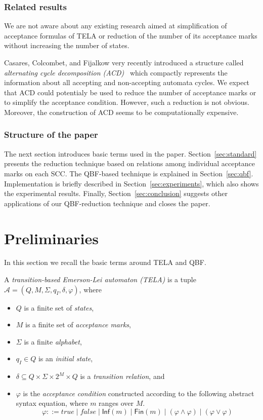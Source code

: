 \documentclass[runningheads]{llncs}
\def\Inf{\ensuremath{\mathsf{Inf}}}
\def\Fin{\ensuremath{\mathsf{Fin}}}
\def\false{\mathit{false}}
\def\true{\mathit{true}}
\newcommand{\mA}{\mathcal{A}}
\begin{document}
\subsubsection{Related results}
We are not aware about any existing research aimed at simplification
of acceptance formulas of TELA or reduction of the number of its
acceptance marks without increasing the number of states.

Casares, Colcombet, and Fijalkow very recently introduced a structure
called \emph{alternating cycle decomposition
  (ACD)}~\cite{casares.21.icalp} which compactly represents the
information about all accepting and non-accepting automata cycles.  We
expect that ACD could potentialy be used to reduce the number of
acceptance marks or to simplify the acceptance condition. However,
such a reduction is not obvious. Moreover, the construction of ACD
seems to be computationally expensive.

\subsubsection{Structure of the paper} The next section introduces
basic terms used in the paper. Section~\ref{sec:standard} presents the
reduction technique based on relations among individual acceptance
marks on each SCC. The QBF-based technique is explained in
Section~\ref{sec:qbf}. Implementation is briefly described in
Section~\ref{sec:experiments}, which also shows the experimental
results. Finally, Section~\ref{sec:conclusion} suggests other
applications of our QBF-reduction technique and closes the paper.


\section{Preliminaries}\label{sec:prelim}

In this section we recall the basic terms around TELA and QBF.

\begin{definition}[TELA]
  A \emph{transition-based Emerson-Lei automaton (TELA)} is a tuple
  $\mA =(Q,M,\Sigma,q_I,\delta,\varphi)$, where
  \begin{itemize}
  \item $Q$ is a finite set of \emph{states},
  \item $M$ is a finite set of \emph{acceptance marks},
  \item $\Sigma$ is a finite \emph{alphabet},
  \item $q_I\in Q$ is an \emph{initial state},
  \item $\delta \subseteq Q \times \Sigma \times 2^{M} \times Q$ is a
    \emph{transition relation}, and
  \item $\varphi$ is the \emph{acceptance condition} constructed
    according to the following abstract syntax equation, where $m$
    ranges over $M$.
    $$\varphi ::= \true \mid \false \mid \Inf(m) \mid \Fin(m) \mid \left( \varphi \land \varphi \right) \mid \left( \varphi \lor \varphi \right)$$
\end{itemize}
\end{definition}
\end{document}
